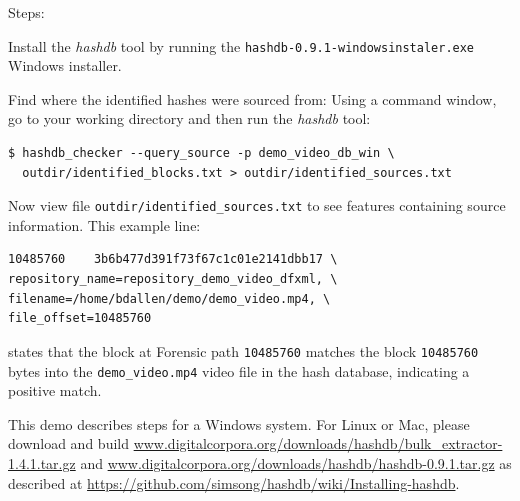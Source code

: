 \documentclass[12pt,twoside]{article}
\newcommand{\hdb}{\emph{hashdb}\xspace}
\begin{document}
Steps:
\begin{compactenum}
\item Install the \hdb tool by running the
\texttt{hashdb-0.9.1-windowsinstaler.exe} Windows installer.
\item Find where the identified hashes were sourced from:
Using a command window, go to your working directory and then run
the \hdb tool:
\begin{verbatim}
$ hashdb_checker --query_source -p demo_video_db_win \
  outdir/identified_blocks.txt > outdir/identified_sources.txt
\end{verbatim}

\item Now view file \texttt{outdir/identified\_sources.txt} to see
features containing source information.
This example line:
\begin{verbatim}
10485760    3b6b477d391f73f67c1c01e2141dbb17 \
repository_name=repository_demo_video_dfxml, \
filename=/home/bdallen/demo/demo_video.mp4, \
file_offset=10485760
\end{verbatim}

states that the block at Forensic path \texttt{10485760}
matches the block \texttt{10485760} bytes into the
\texttt{demo\_video.mp4} video file
in the hash database,
indicating a positive match.
\end{compactenum}

This demo describes steps for a Windows system.
For Linux or Mac, please download and build
\url{www.digitalcorpora.org/downloads/hashdb/bulk\_extractor-1.4.1.tar.gz}
and
\url{www.digitalcorpora.org/downloads/hashdb/hashdb-0.9.1.tar.gz}
as described at
\url{https://github.com/simsong/hashdb/wiki/Installing-hashdb}.
\end{document}
